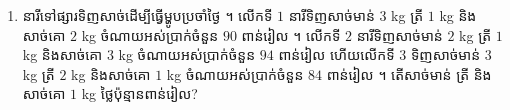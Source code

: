 \begin{enumerate}[1]
\begin{enumerate}[a]
    \item $\begin{cases} x - 2y + 3z = 4\\ 2x + y - 4z = 3\\ -3x + 4y - z = -2 \end{cases}$
    \item $\begin{cases} 4x + 2y + 7z = 35\\ 3x + y + 8z = 25\\ 5x + 3y + z = 40 \end{cases}$ ។
  \end{enumerate}
  \item នារីទៅផ្សារទិញសាច់ដើម្បីធ្វើម្ហូបប្រចាំថ្ងៃ ។ លើកទី $1$ នារីទិញសាច់មាន់ $3$ kg ត្រី $1$ kg និងសាច់គោ $2$ kg ចំណាយអស់ប្រាក់ចំនួន $90$ ពាន់រៀល ។ លើកទី $2$ នារីទិញសាច់មាន់ $2$ kg ត្រី $1$ kg និងសាច់គោ $3$ kg ចំណាយអស់ប្រាក់ចំនួន $94$ ពាន់រៀល ហើយលើកទី $3$ ទិញសាច់មាន់ $3$ kg ត្រី $2$ kg និងសាច់គោ $1$ kg ចំណាយអស់ប្រាក់ចំនួន $84$ ពាន់រៀល ។ តើសាច់មាន់ ត្រី និងសាច់គោ $1$ kg ថ្លៃប៉ុន្មានពាន់រៀល?
\end{enumerate}

